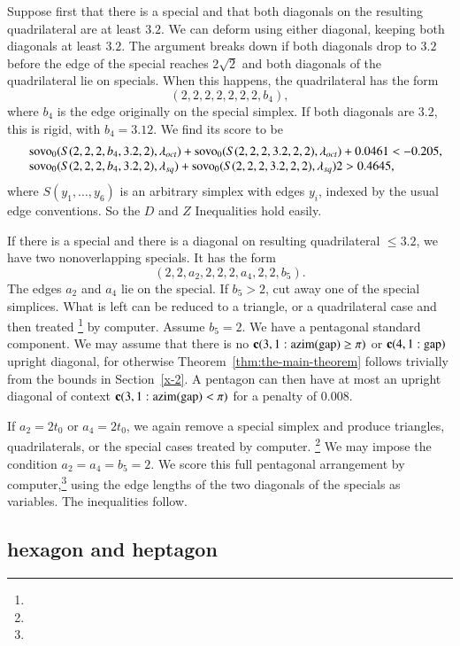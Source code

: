 Suppose first that there is a special and that both diagonals on the
resulting quadrilateral are at least $3.2$.  We can deform using either
diagonal, keeping both diagonals at least $3.2$. The argument breaks
down if both diagonals drop to $3.2$ before the edge of the special
reaches $2\sqrt{2}$ and both diagonals of the quadrilateral lie on
specials. When this happens, the quadrilateral has the form
    $$(2,2,2,2,2,2,2,b_4),$$
where $b_4$ is the edge originally on the special simplex.  If both
diagonals are $3.2$, this is rigid, with $b_4= 3.12$. We find its score
to be
    $$
    \begin{array}{lll}
    &{\operatorname{sovo}}_0(S(2,2,2,b_4,3.2,2),\lambda_{oct})+{\operatorname{sovo}}_0(S(2,2,2,3.2,2,2),\lambda_{oct})+0.0461<-0.205,\\
    &{\operatorname{sovo}}_0(S(2,2,2,b_4,3.2,2),\lambda_{sq})+{\operatorname{sovo}}_0(S(2,2,2,3.2,2,2),\lambda_{sq})2> 0.4645,\\
    \end{array}
    $$
where $S(y_1,\ldots,y_6)$ is an arbitrary simplex with edges $y_i$,
indexed by the usual edge conventions.
So the $D$ and $Z$ Inequalities hold easily.

If there is a special and there is a diagonal on resulting quadrilateral
$\le3.2$, we have two nonoverlapping specials.  It has the form
    $$(2,2,a_2,2,2,2,a_4,2,2,b_5).$$
The edges $a_2$ and $a_4$ lie on the special.  If $b_5>2$, cut
away one of the special simplices.  What is left can be reduced to
a triangle, or a quadrilateral case and then treated%
\footnote{} %
by computer. %
Assume
$b_5=2$.  We have a pentagonal standard component. We may assume that
there is no ${\operatorname{\bf c}}{(3,1: {\operatorname{azim}}({\operatorname{gap}}) \ge \pi)}$ or ${\operatorname{\bf c}}{(4,1:{\operatorname{gap}})}$ upright diagonal, for
otherwise Theorem~\ref{thm:the-main-theorem} follows trivially
from the bounds in Section~\ref{x-2}. A pentagon can then have at
most an upright diagonal of context ${\operatorname{\bf c}}{(3,1: {\operatorname{azim}}({\operatorname{gap}}) <\pi)}$ for a penalty of $0.008$.

If $a_2=2t_0$ or $a_4=2t_0$, we again remove a special simplex and
produce triangles, quadrilaterals, or the special cases treated
by computer.%
\footnote{} %
We may impose the condition $a_2=a_4=b_5=2$. We score this full pentagonal
arrangement by computer,\footnote{} %
using the edge lengths of the two diagonals of
the specials as variables. The inequalities follow.

\subsection{hexagon and heptagon} %

